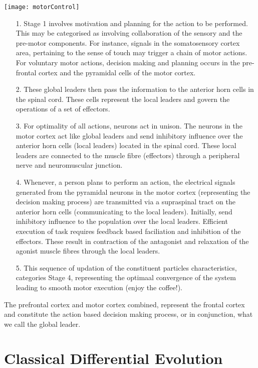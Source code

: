 \documentclass[conference]{IEEEtran}
\begin{document}
\texttt{[image: motorControl]}

\begin{itemize}
\item[1.] Stage 1 involves motivation and planning for the action to be performed. This may be categorised as involving collaboration of the sensory and the pre-motor components. For instance, signals in the somatosensory cortex area, pertaining to the sense of touch may trigger a chain of motor actions. For voluntary motor actions, decision making and planning occurs in the pre-frontal cortex and the  pyramidal cells of the motor cortex.

\item[2.] These global leaders then pass the information to the anterior horn cells in the spinal cord. These cells represent the local leaders and govern the operations of a set of effectors.

\item[3.] For optimality of all actions, neurons act in unison. The neurons in the motor cortex act like global leaders and send inhibitory influence over the anterior horn cells (local leaders) located in the spinal cord. These local leaders are connected to the muscle fibre (effectors) through a peripheral nerve and neuromuscular junction.

\item[4.] Whenever, a person plans to perform an action, the electrical signals generated from the pyramidal neurons in the motor cortex (representing the decision making process) are transmitted via a supraspinal tract on the anterior horn cells (communicating to the local leaders). Initially, send inhibitory influence to the population over the local leaders. Efficient execution of task requires feedback based faciliation and inhibition of the effectors. These result in contraction of the antagonist and relaxation of the agonist muscle fibres through the local leaders.

\item[5.] This sequence of updation of the constituent particles characteristics, categories Stage 4, representing the optimaal convergence of the system leading to smooth motor execution (enjoy the coffee!).
\end{itemize}

The prefrontal cortex and motor cortex combined, represent the frontal cortex and constitute the action based decision making process, or in conjunction, what we call the global leader.


\section{Classical Differential Evolution}
\end{document}
